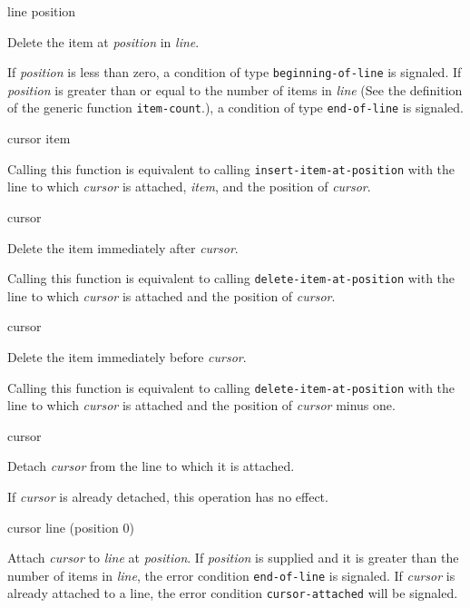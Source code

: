 {line position}

Delete the item at \textit{position} in \textit{line}.

If \textit{position} is less than zero, a condition of type
\texttt{beginning-of-line} is signaled.  If \textit{position} is
greater than or equal to the number of items in \textit{line} (See the
definition of the generic function \texttt{item-count}.), a condition
of type \texttt{end-of-line} is signaled.

 {cursor item}

Calling this function is equivalent to calling
\texttt{insert-item-at-position} with the line to which
\textit{cursor} is attached, \textit{item}, and the position of
\textit{cursor}.  \howeverperformance{}

\ifdetached{}

 {cursor}

Delete the item immediately after \emph{cursor}.

Calling this function is equivalent to calling
\texttt{delete-item-at-position} with the line to which
\textit{cursor} is attached and the position of \textit{cursor}.
\howeverperformance{}

\ifdetached{}

 {cursor}

Delete the item immediately before \emph{cursor}.

Calling this function is equivalent to calling
\texttt{delete-item-at-position} with the line to which
\textit{cursor} is attached and the position of \textit{cursor} minus
one.  \howeverperformance{}

\ifdetached{}

 {cursor}

Detach \textit{cursor} from the line to which it is attached.

If \textit{cursor} is already detached, this operation has no effect.

 {cursor line \optional (position 0)}

Attach \textit{cursor} to \textit{line} at \textit{position}.  If
\textit{position} is supplied and it is greater than the number of
items in \textit{line}, the error condition \texttt{end-of-line} is
signaled.  If \textit{cursor} is already attached to a line, the error
condition \texttt{cursor-attached} will be signaled.

